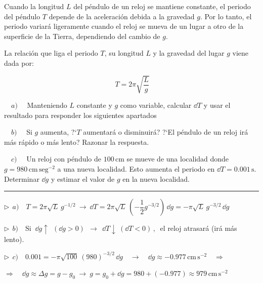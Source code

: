 \vspace{1cm}
\begin{miejercicio}
	
Cuando la longitud $L$ del péndulo de un reloj se mantiene constante, el periodo del péndulo $T$ depende de la aceleración debida a la gravedad $g$. Por lo tanto, el periodo variará ligeramente cuando el reloj se mueva de un lugar a otro de la superficie de la Tierra, dependiendo del cambio de $g$. 
 
\vspace{2mm}La relación que liga el periodo $T$, su longitud $L$ y la gravedad del lugar $g$ viene dada por: 

$$\ T=2\pi \sqrt{\dfrac{L}{g}}$$

$\quad a)\quad $ Manteniendo  $L$ constante y  $g$ como variable, calcular $\dd T$ y usar el resultado para responder los siguientes apartados

\vspace{3mm}$\quad b)\quad $ Si $g$ aumenta, ?`$T$ aumentará o disminuirá? ?`El péndulo de un reloj irá más rápido o más lento? Razonar la respuesta. 

\vspace{3mm}$\quad c)\quad $ Un reloj con péndulo de $100 \, \mathrm{cm}$ se mueve de una localidad donde $g = 980 \, \mathrm{cm\,  seg}^{-2}$ a una nueva localidad. Esto aumenta el periodo en $\dd T = 0.001 \, \mathrm{s}$. Determinar $\dd g$ y estimar el valor de $g$ en la nueva localidad. 
	
\color{teal!80}
\rule{200pt}{0.2pt}
\color{black}
\vspace{5mm}

$\triangleright \ \ a)\quad T=2\pi \sqrt{L}\, g^{-1/2} \ \to \ \dd T=2\pi \sqrt{L}\, \left( -\dfrac 1 2  g^{-3/2}\right) \, \dd g = -\pi \sqrt{L}\, g^{-3/2}\, \dd g$

\vspace{3mm} $\triangleright \ \ b) \quad \text{Si } \ \dd g \uparrow \ \ (\dd g > 0 )\ \ \to \ \  \dd T \downarrow \ (\dd T <0)\, , \ $ el reloj atrasará (irá más lento).  

\vspace{3mm} $\triangleright \ \ c)\quad 0.001=-\pi \sqrt{100}\ (980)^{-3/2}\, \dd g \quad \to \quad \dd g \approx -0.977 \, \mathrm{cm\, s}^{-2} \quad \Rightarrow $

\vspace{3mm} $\Rightarrow \quad  \dd g \approx \Delta g = g-g_0 \ \to \ g=g_0+\dd g = 980 +(-0.977) \approx 979\, \mathrm{cm\, s}^{-2} $

\end{miejercicio}


